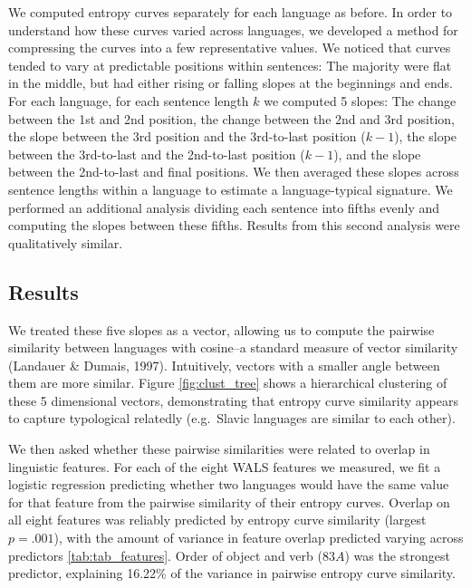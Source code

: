 \documentclass[10pt, letterpaper]{article}
\begin{document}
We computed entropy curves separately for each language as before. In
order to understand how these curves varied across languages, we
developed a method for compressing the curves into a few representative
values. We noticed that curves tended to vary at predictable positions
within sentences: The majority were flat in the middle, but had either
rising or falling slopes at the beginnings and ends. For each language,
for each sentence length \(k\) we computed 5 slopes: The change between
the 1st and 2nd position, the change between the 2nd and 3rd position,
the slope between the 3rd position and the 3rd-to-last position
(\(k-1\)), the slope between the 3rd-to-last and the 2nd-to-last
position (\(k-1\)), and the slope between the 2nd-to-last and final
positions. We then averaged these slopes across sentence lengths within
a language to estimate a language-typical signature. We performed an
additional analysis dividing each sentence into fifths evenly and
computing the slopes between these fifths. Results from this second
analysis were qualitatively similar.

\hypertarget{results-2}{%
\subsection{Results}\label{results-2}}

We treated these five slopes as a vector, allowing us to compute the
pairwise similarity between languages with cosine--a standard measure of
vector similarity (Landauer \& Dumais, 1997). Intuitively, vectors with
a smaller angle between them are more similar. Figure
\ref{fig:clust_tree} shows a hierarchical clustering of these 5
dimensional vectors, demonstrating that entropy curve similarity appears
to capture typological relatedly (e.g.~Slavic languages are similar to
each other).

We then asked whether these pairwise similarities were related to
overlap in linguistic features. For each of the eight WALS features we
measured, we fit a logistic regression predicting whether two languages
would have the same value for that feature from the pairwise similarity
of their entropy curves. Overlap on all eight features was reliably
predicted by entropy curve similarity (largest \(p = .001\)), with the
amount of variance in feature overlap predicted varying across
predictors \ref{tab:tab_features}. Order of object and verb (\(83A\))
was the strongest predictor, explaining 16.22\% of the variance in
pairwise entropy curve similarity.
\end{document}
